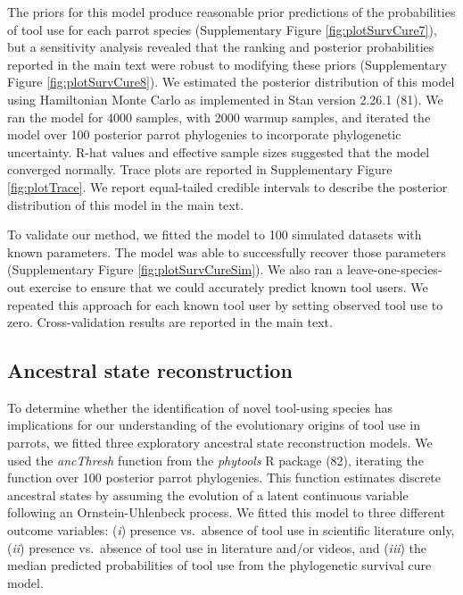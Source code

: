 \documentclass[
  man,floatsintext]{apa6}
\begin{document}
The priors for this model produce reasonable prior predictions of the
probabilities of tool use for each parrot species (Supplementary Figure
\ref{fig:plotSurvCure7}), but a sensitivity analysis revealed that the ranking
and posterior probabilities reported in the main text were robust to modifying
these priors (Supplementary Figure \ref{fig:plotSurvCure8}). We estimated the
posterior distribution of this model using Hamiltonian Monte Carlo as
implemented in Stan version 2.26.1 (81). We ran the model for 4000
samples, with 2000 warmup samples, and iterated the model over 100 posterior
parrot phylogenies to incorporate phylogenetic uncertainty. R-hat values and
effective sample sizes suggested that the model converged normally. Trace plots
are reported in Supplementary Figure \ref{fig:plotTrace}. We report
equal-tailed credible intervals to describe the posterior distribution of this
model in the main text.

To validate our method, we fitted the model to 100 simulated datasets with known
parameters. The model was able to successfully recover those parameters
(Supplementary Figure \ref{fig:plotSurvCureSim}). We also ran a
leave-one-species-out exercise to ensure that we could accurately predict known
tool users. We repeated this approach for each known tool user by setting
observed tool use to zero. Cross-validation results are reported in the main
text.

\hypertarget{ancestral-state-reconstruction}{%
\subsection{Ancestral state reconstruction}\label{ancestral-state-reconstruction}}

To determine whether the identification of novel tool-using species has
implications for our understanding of the evolutionary origins of tool use in
parrots, we fitted three exploratory ancestral state reconstruction models. We
used the \emph{ancThresh} function from the \emph{phytools} R package (82),
iterating the function over 100 posterior parrot phylogenies. This function
estimates discrete ancestral states by assuming the evolution of a latent
continuous variable following an Ornstein-Uhlenbeck process. We fitted this
model to three different outcome variables: (\emph{i}) presence vs.~absence of tool
use in scientific literature only, (\emph{ii}) presence vs.~absence of tool use in
literature and/or videos, and (\emph{iii}) the median predicted probabilities of tool
use from the phylogenetic survival cure model.
\end{document}
